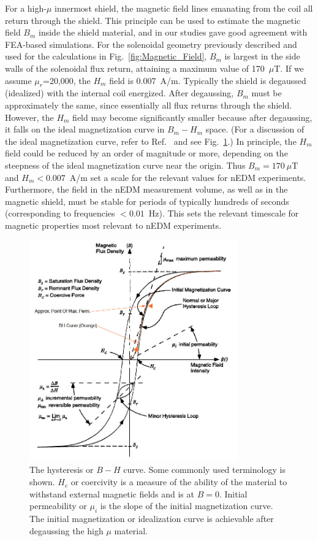 For a high-$\mu$ innermost shield, the magnetic field lines emanating
from the coil all return through the shield.  This principle can be
used to estimate the magnetic field $B_m$ inside the shield material,
and in our studies gave good agreement with FEA-based simulations.
For the solenoidal geometry previously described and used for the
calculations in Fig.~\ref{fig:Magnetic_Field}, $B_m$ is largest in the
side walls of the solenoidal flux return, attaining a maximum value of
170~$\mu$T.  If we assume $\mu_r$=20,000, the $H_m$ field is
0.007~A/m.  Typically the shield is degaussed (idealized) with the
internal coil energized. After degaussing, $B_m$ must be approximately
the same, since essentially all flux returns through the shield.
However, the $H_m$ field may become significantly smaller because
after degaussing, it falls on the ideal magnetization curve in
$B_m-H_m$ space.  (For a discussion of the ideal magnetization curve,
refer to Ref.~\cite{bozorth1993ferromagnetism} and see
Fig.~\ref{fig:bh}.)  In principle, the $H_m$ field could be reduced by
an order of magnitude or more, depending on the steepness of the ideal
magnetization curve near the origin.  Thus $B_m=170~\mu$T and
$H_m<0.007$~A/m set a scale for the relevant values for nEDM
experiments.  Furthermore, the field in the nEDM measurement volume,
as well as in the magnetic shield, must be stable for periods of
typically hundreds of seconds (corresponding to frequencies
$<0.01$~Hz). This sets the relevant timescale for magnetic properties
most relevant to nEDM experiments.


\begin{figure}[h!]
  \centering
  \includegraphics[width=0.8\textwidth]{bh.jpg}
  \caption[The hysteresis or $B-H$ curve]{\cite{wiki:bh}The hysteresis
    or $B-H$ curve. Some commonly used terminology is shown. $H_c$ or
    coercivity is a measure of the ability of the material to
    withstand external magnetic fields and is at $B=0$. Initial
    permeability or $\mu_i$ is the slope of the initial magnetization
    curve. The initial magnetization or idealization curve is
    achievable after degaussing the high $\mu$ material.}
  \label{fig:bh}
\end{figure}
